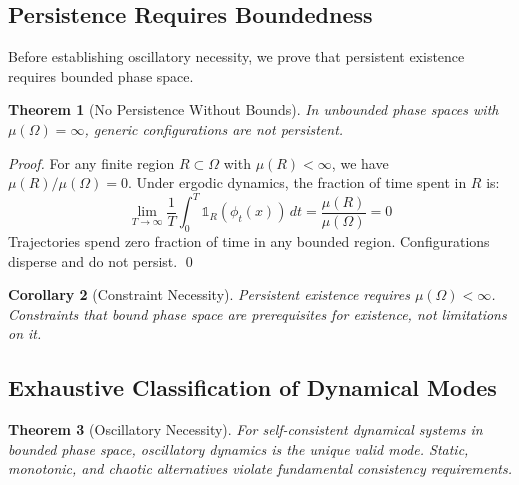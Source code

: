 \documentclass[twocolumn,10pt,a4paper]{article}
\newtheorem{theorem}{Theorem}[section]
\newtheorem{corollary}[theorem]{Corollary}
\theoremstyle{definition}
\theoremstyle{remark}
\begin{document}
\subsection{Persistence Requires Boundedness}

Before establishing oscillatory necessity, we prove that persistent existence requires bounded phase space.

\begin{theorem}[No Persistence Without Bounds]
\label{thm:no-persistence}
In unbounded phase spaces with $\mu(\Omega) = \infty$, generic configurations are not persistent.
\end{theorem}

\begin{proof}
For any finite region $R \subset \Omega$ with $\mu(R) < \infty$, we have $\mu(R)/\mu(\Omega) = 0$. Under ergodic dynamics, the fraction of time spent in $R$ is:
\begin{equation}
    \lim_{T \to \infty} \frac{1}{T} \int_0^T \mathbb{1}_R(\phi_t(x)) \, dt = \frac{\mu(R)}{\mu(\Omega)} = 0
\end{equation}
Trajectories spend zero fraction of time in any bounded region. Configurations disperse and do not persist. \qed
\end{proof}

\begin{corollary}[Constraint Necessity]
\label{cor:constraint}
Persistent existence requires $\mu(\Omega) < \infty$. Constraints that bound phase space are prerequisites for existence, not limitations on it.
\end{corollary}

\subsection{Exhaustive Classification of Dynamical Modes}

\begin{theorem}[Oscillatory Necessity]
\label{thm:oscillatory}
For self-consistent dynamical systems in bounded phase space, oscillatory dynamics is the unique valid mode. Static, monotonic, and chaotic alternatives violate fundamental consistency requirements.
\end{theorem}
\end{document}
